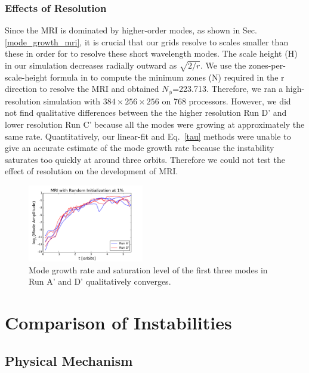 \documentclass[iop,revtex4]{emulateapj}
\begin{document}
\subsubsection{Effects of Resolution}
\par Since the \ac{MRI} is dominated by higher-order modes, as shown in Sec.\ref{mode_growth_mri}, it is crucial that our grids resolve to scales smaller than these in order for to resolve these short wavelength modes. The scale height (H) in our simulation decreases radially outward as $\sqrt{2/r}$. We use the zones-per-scale-height formula in \cite{Hawley:2011A} to compute the minimum zones (N) required in the r direction to resolve the \ac{MRI} and obtained $N_\phi$=223.713. Therefore, we ran a high-resolution simulation with $384\times 256\times 256$ on 768 processors.  However, we did not find qualitative differences between the the higher resolution Run D' and lower resolution Run C' because all the modes were growing at approximately the same rate. Quantitatively, our linear-fit and Eq.~\ref{tau} methods were unable to give an accurate estimate of the mode growth rate because the instability saturates too quickly at around three orbits. Therefore we could not test the effect of resolution on the development of \ac{MRI}.
\begin{figure}[ht]
\includegraphics[width=0.45\textwidth,bb=0 0 30 30]{plots/mri_randinit1percent.pdf}
\caption{Mode growth rate and saturation level of the first three modes in Run A' and D' qualitatively converges.}
\label{mri_mode_growth}
\end{figure}

\section{Comparison of Instabilities}
\subsection{Physical Mechanism\label{ppi_mri_story}}
\end{document}
